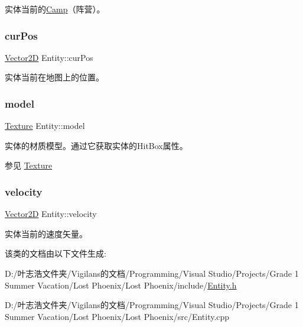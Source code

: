 实体当前的\hyperlink{_entity_8h_ad54c4fe39f1c51b786c24ae0b7763b44}{Camp}（阵营）。 

\mbox{\label{class_entity_a5031aa6b058f2231daad16b35e3d536d}} 
\subsubsection{\texorpdfstring{cur\+Pos}{curPos}}
{\footnotesize\ttfamily \hyperlink{structbasic__vector2_d}{Vector2D} Entity\+::cur\+Pos\hspace{0.3cm}{\ttfamily [protected]}}



实体当前在地图上的位置。 

\mbox{\label{class_entity_a22ccba8fb86e5b4e10b2c33b6f56d238}} 
\subsubsection{\texorpdfstring{model}{model}}
{\footnotesize\ttfamily \hyperlink{struct_texture}{Texture} Entity\+::model\hspace{0.3cm}{\ttfamily [protected]}}



实体的材质模型。通过它获取实体的\+Hit\+Box属性。\begin{DoxySeeAlso}{参见}
\hyperlink{struct_texture}{Texture}


\end{DoxySeeAlso}


\mbox{\label{class_entity_a386d25b56772b8913eb3e5adc636f6e0}} 
\subsubsection{\texorpdfstring{velocity}{velocity}}
{\footnotesize\ttfamily \hyperlink{structbasic__vector2_d}{Vector2D} Entity\+::velocity\hspace{0.3cm}{\ttfamily [protected]}}



实体当前的速度矢量。 



该类的文档由以下文件生成\+:\begin{DoxyCompactItemize}
\item 
D\+:/叶志浩文件夹/\+Vigilans的文档/\+Programming/\+Visual Studio/\+Projects/\+Grade 1 Summer Vacation/\+Lost Phoenix/\+Lost Phoenix/include/\hyperlink{_entity_8h}{Entity.\+h}\item 
D\+:/叶志浩文件夹/\+Vigilans的文档/\+Programming/\+Visual Studio/\+Projects/\+Grade 1 Summer Vacation/\+Lost Phoenix/\+Lost Phoenix/src/Entity.\+cpp\end{DoxyCompactItemize}
